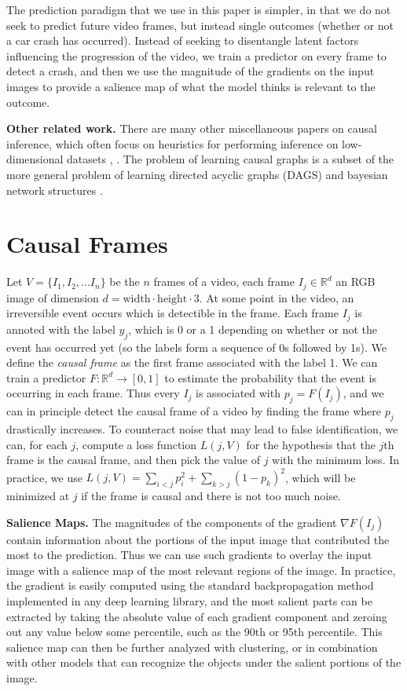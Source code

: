 \documentclass[letterpaper]{article} %
\begin{document}
The prediction paradigm that we use in this paper is simpler, in that we do not seek to predict future video frames, but instead single outcomes (whether or not a car crash has occurred). Instead of seeking to disentangle latent factors influencing the progression of the video, we train a predictor on every frame to detect a crash, and then we use the magnitude of the gradients on the input images to provide a salience map of what the model thinks is relevant to the outcome. %

\noindent \textbf{Other related work.} There are many other miscellaneous papers on causal inference, which often focus on heuristics for performing inference on low-dimensional datasets \cite{veitch2019using}, \cite{rojas2018invariant}. The problem of learning causal graphs is a subset of the more general problem of learning directed acyclic graphs (DAGS) \cite{xie2008recursive} and bayesian network structures \cite{daly2011learning}. %

\section{Causal Frames}

Let $V = \{I_1, I_2, ... I_n\}$ be the $n$ frames of a video, each frame $I_j  \in \mathbb{R}^d$ an RGB image of dimension $d=\text{width}\cdot\text{height}\cdot 3$. At some point in the video, an irreversible event occurs which is detectible in the frame. Each frame $I_j$ is annoted with the label $y_j$, which is 0 or a 1 depending on whether or not the event has occurred yet (so the labels form a sequence of 0s followed by 1s). We define the \emph{causal frame} as the first frame associated with the label 1. We can train a predictor $F: \mathbb{R}^d \rightarrow [0,1]$ to estimate the probability that the event is occurring in each frame. Thus every $I_j$ is associated with $p_j = F(I_j)$, and we can in principle detect the causal frame of a video by finding the frame where $p_j$ drastically increases. To counteract noise that may lead to false identification, we can, for each $j$, compute a loss function $L(j, V)$ for the hypothesis that the $j$th frame is the causal frame, and then pick the value of $j$ with the minimum loss. In practice, we use  $L(j, V) = \sum_{i<j} p_i^2 + \sum_{k>j} (1-p_k)^2$, which will be minimized at $j$ if the frame is causal and there is not too much noise. 

\noindent \textbf{Salience Maps.} The magnitudes of the components of the gradient $\nabla F(I_j)$ contain information about the portions of the input image that contributed the most to the prediction. Thus we can use such gradients to overlay the input image with a salience map of the most relevant regions of the image. In practice, the gradient is easily computed using the standard backpropagation method implemented in any deep learning library, and the most salient parts can be extracted by taking the absolute value of each gradient component and zeroing out any value below some percentile, such as the 90th or 95th percentile. This salience map can then be further analyzed with clustering, or in combination with other models that can recognize the objects under the salient portions of the image.
\end{document}
